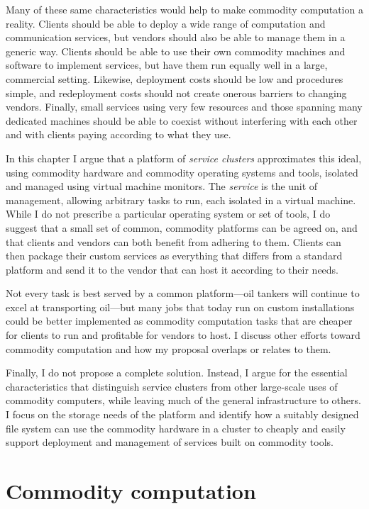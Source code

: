 Many of these same characteristics would help to make commodity computation a reality. Clients should be able to deploy a wide range of computation and communication services, but vendors should also be able to manage them in a generic way. Clients should be able to use their own commodity machines and software to implement services, but have them run equally well in a large, commercial setting. Likewise, deployment costs should be low and procedures simple, and redeployment costs should not create onerous barriers to changing vendors. Finally, small services using very few resources and those spanning many dedicated machines should be able to coexist without interfering with each other and with clients paying according to what they use.

In this chapter I argue that a platform of \emph{service clusters} approximates this ideal, using commodity hardware and commodity operating systems and tools, isolated and managed using virtual machine monitors. The \emph{service} is the unit of management, allowing arbitrary tasks to run, each isolated in a virtual machine. While I do not prescribe a particular operating system or set of tools, I do suggest that a small set of common, commodity platforms can be agreed on, and that clients and vendors can both benefit from adhering to them. Clients can then package their custom services as everything that differs from a standard platform and send it to the vendor that can host it according to their needs.

Not every task is best served by a common platform---oil tankers will continue to excel at transporting oil---but many jobs that today run on custom installations could be better implemented as commodity computation tasks that are cheaper for clients to run and profitable for vendors to host. I discuss other efforts toward commodity computation and how my proposal overlaps or relates to them.

Finally, I do not propose a complete solution. Instead, I argue for the essential characteristics that distinguish service clusters from other large-scale uses of commodity computers, while leaving much of the general infrastructure to others. I focus on the storage needs of the platform and identify how a suitably designed file system can use the commodity hardware in a cluster to cheaply and easily support deployment and management of services built on commodity tools.

\section{Commodity computation}

